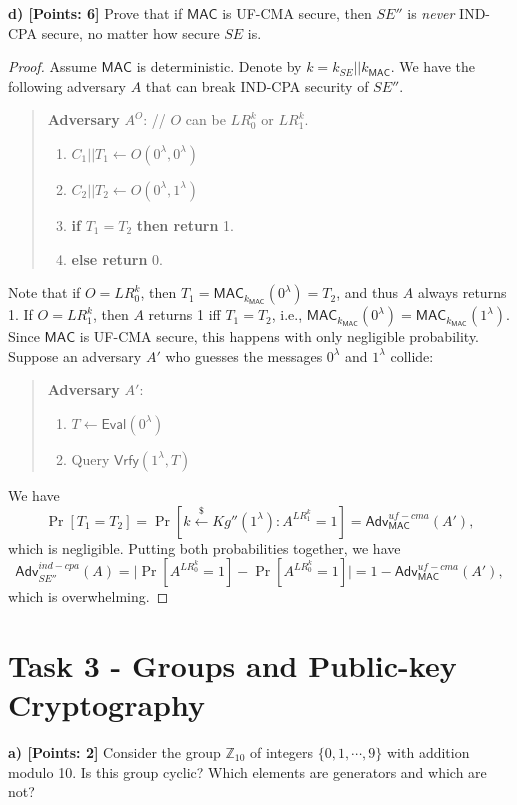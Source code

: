 \documentclass[12pt]{article}
\newcommand{\Z}{\mathbb{Z}}
\newcommand{\getsr}{\stackrel{\$}{\gets}}
\newcommand{\Adv}{\textsf{Adv}}
\newcommand{\MAC}{\textsf{MAC}}
\theoremstyle{definition}
\begin{document}
{\bf d) [Points: 6]} Prove that if $\MAC$ is UF-CMA secure, then $SE''$ is {\it never} IND-CPA secure, no matter how secure $SE$ is.
\begin{proof}
Assume $\MAC$ is deterministic. Denote by $k = k_{SE}||k_{\MAC}$. We have the following adversary $A$ that can break IND-CPA security of $SE''$.
\begin{quote}
{\bf Adversary} $A^O$: // $O$ can be $LR_0^k$ or $LR_1^k$.
\begin{enumerate}
\item $C_1 || T_1 \gets O(0^\lambda, 0^\lambda)$
\item $C_2 || T_2 \gets O(0^\lambda, 1^\lambda)$
\item {\bf if} $T_1 = T_2$ {\bf then return} 1.
\item {\bf else return} 0.
\end{enumerate}
\end{quote}
Note that if $O = LR_0^k$, then $T_1 = \MAC_{k_{\MAC}}(0^\lambda) = T_2$, and thus $A$ always returns 1. If $O = LR_1^k$, then $A$ returns 1 iff $T_1 = T_2$, i.e., $\MAC_{k_{\MAC}}(0^\lambda) = \MAC_{k_{\MAC}}(1^\lambda)$. Since $\MAC$ is UF-CMA secure, this happens with only negligible probability. Suppose an adversary $A'$ who guesses the messages $0^\lambda$ and $1^\lambda$ collide:
\begin{quote}
{\bf Adversary} $A'$:
\begin{enumerate}
\item $T \gets \textsf{Eval}(0^\lambda)$
\item Query $\textsf{Vrfy}(1^\lambda, T)$
\end{enumerate}
\end{quote}
We have
$$\Pr[T_1 = T_2] = \Pr[k \getsr Kg''(1^\lambda) : A^{LR_1^k}=1] = \Adv_{\MAC}^{uf-cma}(A'),$$
which is negligible. Putting both probabilities together, we have
$$\Adv_{SE''}^{ind-cpa}(A) = \bigg| \Pr[A^{LR_0^k}=1] -\Pr[A^{LR_0^k}=1] \bigg| = 1 - \Adv_{\MAC}^{uf-cma}(A'),$$
which is overwhelming.
\end{proof}

\section{Task 3 - Groups and Public-key Cryptography}

{\bf a) [Points: 2]} Consider the group $\Z_{10}$ of integers $\{0, 1, \cdots, 9\}$ with addition modulo 10. Is this group cyclic? Which elements are generators and which are not?
\end{document}
